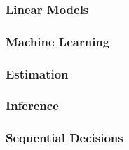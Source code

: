 \documentclass[../main.tex]{subfiles}
\begin{document}
\subsubsection{Linear Models}

\subsubsection{Machine Learning}

\subsubsection{Estimation}

\subsubsection{Inference}

\subsubsection{Sequential Decisions}
\end{document}
